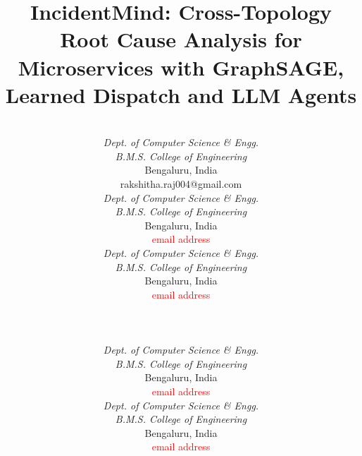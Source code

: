\documentclass[conference,a4paper]{IEEEtran}
\begin{document}
\title{IncidentMind: Cross-Topology Root Cause Analysis for Microservices with GraphSAGE, Learned Dispatch and LLM Agents}

\author{\setlength{\tabcolsep}{0pt}%
\begin{tabular*}{\textwidth}{@{\extracolsep{\fill}}ccc}
\begin{tabular}[t]{@{}c@{}}{\fontsize{11}{13}\selectfont Rakshitha Yathiraj}\\\textit{Dept. of Computer Science \& Engg.}\\\textit{B.M.S. College of Engineering}\\Bengaluru, India\\ rakshitha.raj004@gmail.com\end{tabular} &
\begin{tabular}[t]{@{}c@{}}{\fontsize{11}{13}\selectfont \textcolor{red}{Author Name}}\\\textit{Dept. of Computer Science \& Engg.}\\\textit{B.M.S. College of Engineering}\\Bengaluru, India\\ \textcolor{red}{email address}\end{tabular} &
\begin{tabular}[t]{@{}c@{}}{\fontsize{11}{13}\selectfont \textcolor{red}{Author Name}}\\\textit{Dept. of Computer Science \& Engg.}\\\textit{B.M.S. College of Engineering}\\Bengaluru, India\\ \textcolor{red}{email address}\end{tabular}
\end{tabular*}\\[12pt]
\begin{tabular*}{0.72\textwidth}{@{\extracolsep{\fill}}cc}
\begin{tabular}[t]{@{}c@{}}{\fontsize{11}{13}\selectfont \textcolor{red}{Author Name}}\\\textit{Dept. of Computer Science \& Engg.}\\\textit{B.M.S. College of Engineering}\\Bengaluru, India\\ \textcolor{red}{email address}\end{tabular} &
\begin{tabular}[t]{@{}c@{}}{\fontsize{11}{13}\selectfont \textcolor{red}{Author Name}}\\\textit{Dept. of Computer Science \& Engg.}\\\textit{B.M.S. College of Engineering}\\Bengaluru, India\\ \textcolor{red}{email address}\end{tabular}
\end{tabular*}}
\end{document}
